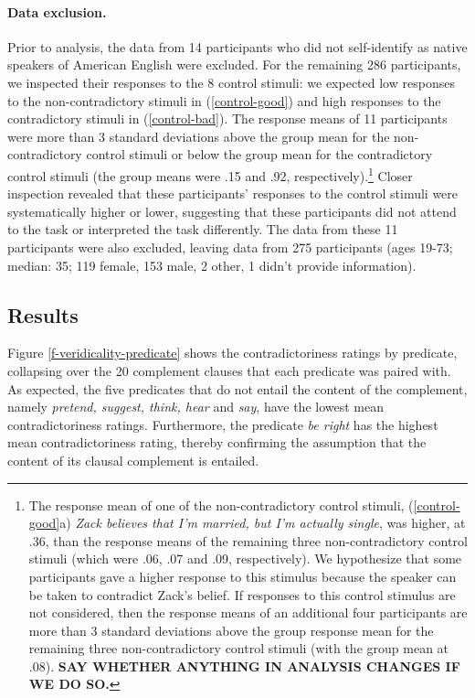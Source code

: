 \documentclass[11pt,fleqn]{article}
\newcommand{\6}{\mbox{$[\hspace*{-.6mm}[$}}
\newcommand{\9}{\mbox{$]\hspace*{-.6mm}]$}}
\begin{document}
\paragraph{Data exclusion.}
Prior to analysis, the data from 14 participants who did not self-identify as native speakers of American English were excluded. For the remaining 286 participants, we inspected their responses to the 8 control stimuli: we expected low responses to the non-contradictory stimuli in (\ref{control-good}) and high responses to the contradictory stimuli in (\ref{control-bad}). The response means of 11 participants were more than 3 standard deviations above the group mean for the non-contradictory control stimuli or below the group mean for the contradictory control stimuli (the group means were .15 and .92, respectively).\footnote{The response mean of one of the non-contradictory control stimuli, (\ref{control-good}a) {\em Zack believes that I'm married, but I'm actually single}, was higher, at .36, than the response means of the remaining three non-contradictory control stimuli (which were .06, .07 and .09, respectively). We hypothesize that some participants gave a higher response to this stimulus because the speaker can be taken to contradict Zack's belief. If responses to this control stimulus are not considered, then the response means of an additional four participants are more than 3 standard deviations above the group response mean for the remaining three non-contradictory control stimuli (with the group mean at .08). {\bf SAY WHETHER ANYTHING IN ANALYSIS CHANGES IF WE DO SO.}} Closer inspection revealed that these participants' responses to the control stimuli were systematically higher or lower, suggesting that these participants did not attend to the task or interpreted the task differently. The data from these 11 participants were also excluded, leaving data from 275 participants (ages 19-73; median: 35; 119 female, 153 male, 2 other, 1 didn't provide information).  

\subsection{Results}

Figure \ref{f-veridicality-predicate} shows the contradictoriness ratings by predicate, collapsing over the 20 complement clauses that each predicate was paired with. As expected, the five predicates that do not entail the content of the complement, namely {\em pretend, suggest, think, hear} and {\em say}, have the lowest mean contradictoriness ratings. Furthermore, the predicate {\em be right} has the highest mean contradictoriness rating, thereby confirming the assumption that the content of its clausal complement is entailed. 
\end{document}
